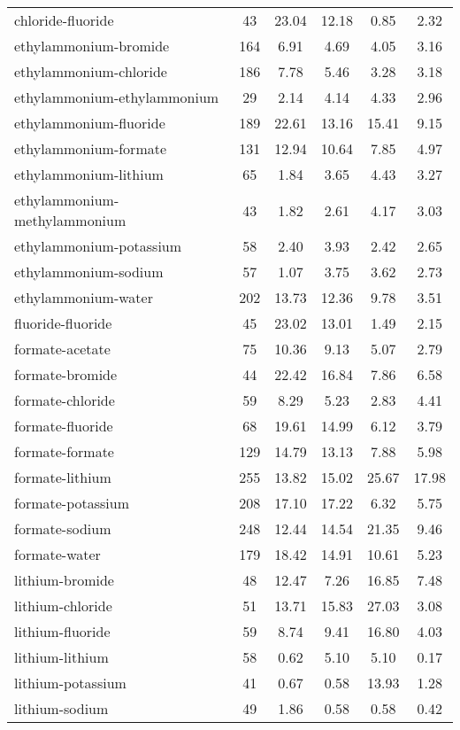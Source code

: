 \begin{longtable}{lccccc}
chloride-fluoride & 43  & 23.04 & 12.18 & 0.85 & 2.32\\
ethylammonium-bromide & 164  & 6.91 & 4.69 & 4.05 & 3.16\\
ethylammonium-chloride & 186  & 7.78 & 5.46 & 3.28 & 3.18\\
ethylammonium-ethylammonium & 29  & 2.14 & 4.14 & 4.33 & 2.96\\
ethylammonium-fluoride & 189  & 22.61 & 13.16 & 15.41 & 9.15\\
ethylammonium-formate & 131  & 12.94 & 10.64 & 7.85 & 4.97\\
ethylammonium-lithium & 65  & 1.84 & 3.65 & 4.43 & 3.27\\
ethylammonium-methylammonium & 43  & 1.82 & 2.61 & 4.17 & 3.03\\
ethylammonium-potassium & 58  & 2.40 & 3.93 & 2.42 & 2.65\\
ethylammonium-sodium & 57  & 1.07 & 3.75 & 3.62 & 2.73\\
ethylammonium-water & 202  & 13.73 & 12.36 & 9.78 & 3.51\\
fluoride-fluoride & 45  & 23.02 & 13.01 & 1.49 & 2.15\\
formate-acetate & 75  & 10.36 & 9.13 & 5.07 & 2.79\\
formate-bromide & 44  & 22.42 & 16.84 & 7.86 & 6.58\\
formate-chloride & 59  & 8.29 & 5.23 & 2.83 & 4.41\\
formate-fluoride & 68  & 19.61 & 14.99 & 6.12 & 3.79\\
formate-formate & 129  & 14.79 & 13.13 & 7.88 & 5.98\\
formate-lithium & 255  & 13.82 & 15.02 & 25.67 & 17.98\\
formate-potassium & 208  & 17.10 & 17.22 & 6.32 & 5.75\\
formate-sodium & 248  & 12.44 & 14.54 & 21.35 & 9.46\\
formate-water & 179  & 18.42 & 14.91 & 10.61 & 5.23\\
lithium-bromide & 48  & 12.47 & 7.26 & 16.85 & 7.48\\
lithium-chloride & 51  & 13.71 & 15.83 & 27.03 & 3.08\\
lithium-fluoride & 59  & 8.74 & 9.41 & 16.80 & 4.03\\
lithium-lithium & 58  & 0.62 & 5.10 & 5.10 & 0.17\\
lithium-potassium & 41  & 0.67 & 0.58 & 13.93 & 1.28\\
lithium-sodium & 49  & 1.86 & 0.58 & 0.58 & 0.42\\

\end{longtable}
